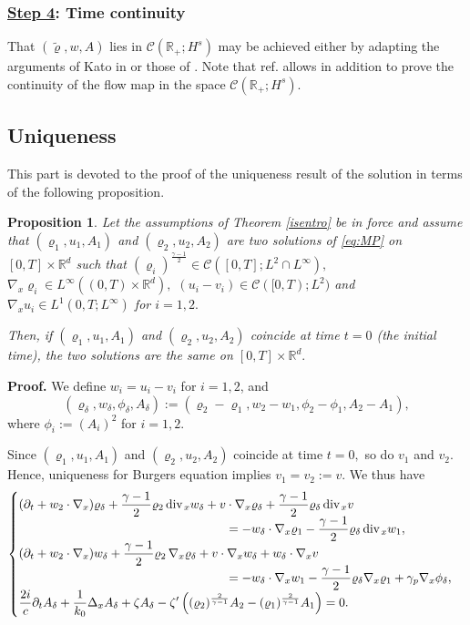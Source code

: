 \documentclass[11pt,twoside]{amsart}
\newtheorem{prop}{Proposition}[section]
\newcommand{\vr}{\varrho}
\newcommand\R{\mathbb{R}}
\newcommand{\ds}{\displaystyle}
\renewcommand{\div}{\mbox{\rm div}\;\!}
\def\dw{\delta\!w}
\def\cC{{\mathcal C}}
\begin{document}
\subsubsection*{\underline{Step 4}: Time continuity}  
That $(\tilde\varrho,w,A)$ lies in $\cC(\R_+;H^s)$ may be achieved either by adapting the arguments of Kato in \cite{K}
or those of \cite[Chap. 4]{BCD}. 
Note that ref. \cite{K} allows in addition to prove the continuity of the flow map in the space $\cC(\R_+;H^s).$ 


\subsection{Uniqueness}

This part is devoted to the proof of the  uniqueness result of the solution in terms of the following proposition.

\begin{prop}\label{locunik}
Let  the assumptions of Theorem \ref{isentro} be in force and 
assume that $(\varrho_1,u_1,A_1)$ and $(\varrho_2,u_2,A_2)$ are two solutions of \eqref{eq:MP} on $[0,T]\times\R^d$
such that $(\varrho_i)^{\frac{\gamma-1}2} \in \cC([0,T];L^2\cap L^\infty),$
$\nabla_x\varrho_i\in L^\infty\left((0,T)\times\R^d\right),$ 
$(u_i-v_i)\in \cC([0,T);L^2)$ and $\nabla_x u_i\in L^1(0,T ; L^\infty)$ for $i=1,2.$

\smallskip 

Then, if $(\varrho_1,u_1,A_1)$ and $(\varrho_2,u_2,A_2)$ coincide at time $t=0$  (the initial time), the two solutions are the same on $[0,T]\times\R^d.$ 
\end{prop}

\noindent 
{\bf Proof.}  We define $w_i = u_i-v_i$ for $i=1,2$, and
$$(\vr_\delta,w_\delta, \phi_\delta, A_\delta):=(\varrho_2-\varrho_1,w_2-w_1,\phi_2-\phi_1,A_2-A_1),$$
where $\phi_{i}:=(A_{i})^2$ for $i=1,2$.

Since $(\varrho_1,u_1,A_1)$ and $(\varrho_2,u_2,A_2)$ coincide at
time $t=0,$ so do $v_1$ and $v_2$. Hence, uniqueness for Burgers equation implies $v_1=v_2:=v$. We thus have  
\begin{align}
\begin{cases} 
\ds (\partial_t+w_2\cdot\nabla_x)\vr_\delta+\frac{\gamma-1}2\varrho_2\,\div_xw_\delta+v\cdot\nabla_x\vr_\delta+\frac{\gamma-1}2\vr_\delta\,\div_x v \\
\hspace{6cm} \ds =
-w_\delta\cdot\nabla_x\varrho_1-\frac{\gamma-1}2\vr_\delta\,\div_x w_1,\\
\ds (\partial_t+w_2 \cdot\nabla_x) w_\delta+\frac{\gamma-1}2\varrho_2\,\nabla_x\vr_\delta + v\cdot\nabla_x w_\delta+w_\delta\cdot\nabla_x v \\
\hspace{6cm}\ds =-w_\delta\cdot\nabla_x w_1 %
         -\frac{\gamma-1}2\vr_\delta \nabla_x\varrho_1+\gamma_p\nabla_x\phi_\delta,\\
\ds \frac{2i}{c}\partial_t  A_\delta+\frac{1}{k_0}\Delta_x  A_\delta+\zeta  A_\delta
-\zeta'\left((\varrho_2)^{\frac{2}{\gamma-1}} A_2-(\varrho_1)^{\frac{2}{\gamma-1}} A_1\right)=0 .
\end{cases}
\end{align} 
\end{document}
